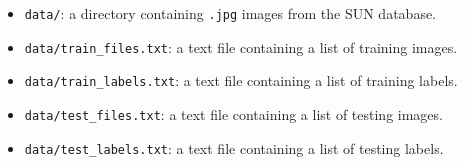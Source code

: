 \documentclass[11pt]{article}
\numberwithin{equation}{section} %
\numberwithin{figure}{section} %
\numberwithin{table}{section} %
\begin{document}
\begin{itemize}
\item {\tt data/}: a directory containing {\tt .jpg} images from the SUN database.
\item {\tt data/train\_files.txt}: a text file containing a list of training images.
\item {\tt data/train\_labels.txt}: a text file containing a list of training labels.
\item {\tt data/test\_files.txt}: a text file containing a list of testing images.
\item {\tt data/test\_labels.txt}: a text file containing a list of testing labels.


\end{itemize}
\end{document}

